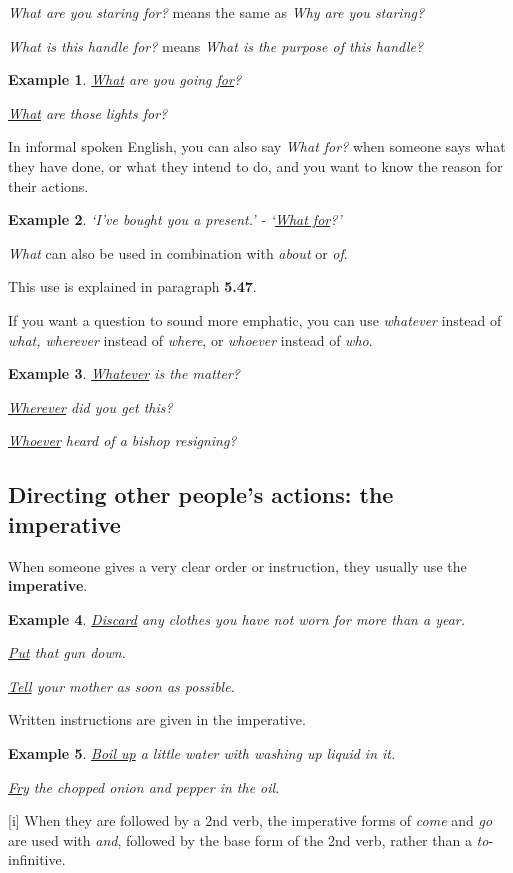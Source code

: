 \documentclass[oneside]{book}
\numberwithin{equation}{section}
\newtheorem{example}{Example}[section]
\begin{document}
\textit{What are you staring for?} means the same as \textit{Why are you staring?}

\textit{What is this handle for?} means \textit{What is the purpose of this handle?}
\begin{example}
    \underline{What} are you going \underline{for}?
    
    \underline{What} are those lights for?
\end{example}
In informal spoken English, you can also say \textit{What for?} when someone says what they have done, or what they intend to do, and you want to know the reason for their actions.
\begin{example}
    `I've bought you a present.' - `\underline{What for}?'
\end{example}
\textit{What} can also be used in combination with \textit{about} or \textit{of}.

This use is explained in paragraph \textbf{5.47}.

%
\noindent{} If you want a question to sound more emphatic, you can use \textit{whatever} instead of \textit{what, wherever} instead of \textit{where}, or \textit{whoever} instead of \textit{who}.
\begin{example}
    \underline{Whatever} is the matter?
    
    \underline{Wherever} did you get this?
    
    \underline{Whoever} heard of a bishop resigning?
\end{example}

\subsection{Directing other people's actions: the imperative}
\noindent{} When someone gives a very clear order or instruction, they usually use the \textbf{imperative}.
\begin{example}
    \underline{Discard} any clothes you have not worn for more than a year.
    
    \underline{Put} that gun down.
    
    \underline{Tell} your mother as soon as possible.
\end{example}
Written instructions are given in the imperative.
\begin{example}
    \underline{Boil up} a little water with washing up liquid in it.
    
    \underline{Fry} the chopped onion and pepper in the oil.
\end{example}
[i] When they are followed by a 2nd verb, the imperative forms of \textit{come} and \textit{go} are used with \textit{and}, followed by the base form of the 2nd verb, rather than a \textit{to}-infinitive.
\end{document}
